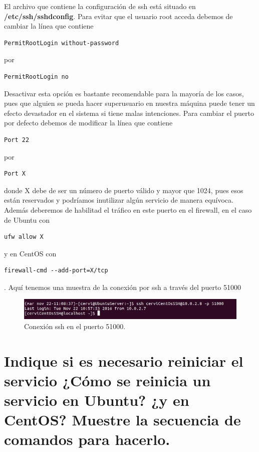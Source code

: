 El archivo que contiene la configuración de ssh está situado en \textbf{/etc/ssh/sshd\textunderscore config}. Para evitar que el usuario root acceda debemos de cambiar la línea que contiene \begin{verbatim}
PermitRootLogin without-password\end{verbatim} por \begin{verbatim}
PermitRootLogin no\end{verbatim} Desactivar esta opción es bastante recomendable para la mayoría de los casos, pues que alguien se pueda hacer superusuario en nuestra máquina puede tener un efecto devastador en el sistema si tiene malas intenciones.\newline
Para cambiar el puerto por defecto debemos de modificar la línea que contiene \begin{verbatim}Port 22\end{verbatim} por \begin{verbatim}Port X\end{verbatim} donde X debe de ser un número de puerto válido y mayor que 1024, pues esos están reservados y podríamos inutilizar algún servicio de manera equívoca. Además deberemos de habilitad el tráfico en este puerto en el firewall, en el caso de Ubuntu con \begin{verbatim}ufw allow X\end{verbatim} y en CentOS con \begin{verbatim}firewall-cmd --add-port=X/tcp\end{verbatim}. Aquí tenemos una muestra de la conexión por ssh a través del puerto 51000
\begin{figure}[H]
	\centering
	\includegraphics[scale=0.75]{ssh-51000.jpg}
	\caption{Conexión ssh en el puerto 51000. \label{fig:figura16}}
\end{figure}
\section{Indique si es necesario reiniciar el servicio ¿Cómo se reinicia un servicio en Ubuntu? ¿y en CentOS? Muestre la secuencia de comandos para hacerlo.}

